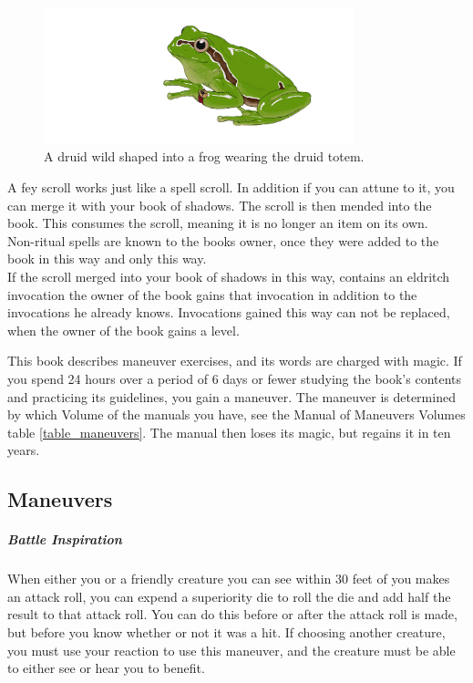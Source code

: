 \documentclass[letter,10pt,twocolumn,openany]{dndbook}
\begin{document}
\begin{figure}
    \includegraphics[width=9cm]{images/frog.png}
    \caption{A druid wild shaped into a frog wearing the druid totem.}
\end{figure}


A fey scroll works just like a spell scroll. In addition if you can attune to it, you can merge it with your book of shadows. The scroll is then mended into the book. This consumes the scroll, meaning it is no longer an item on its own.\\
Non-ritual spells are known to the books owner, once they were added to the book in this way and only this way.\\
If the scroll merged into your book of shadows in this way, contains an eldritch invocation the owner of the book gains that invocation in addition to the invocations he already knows. Invocations gained this way can not be replaced, when the owner of the book gains a level.

This book describes maneuver exercises, and its words are charged with magic.
If you spend 24 hours over a period of 6 days or fewer studying the book's contents and practicing its guidelines, you gain a maneuver.
The maneuver is determined by which Volume of the manuals you have, see the Manual of Maneuvers Volumes table \ref{table_maneuvers}.
The manual then loses its magic, but regains it in ten years.\\

\subsection{Maneuvers}

\subparagraph{Battle Inspiration}
When either you or a friendly creature you can see within 30 feet of you makes an attack roll, you can expend a superiority die to roll the die and add half the result to that attack roll. You can do this before or after the attack roll is made, but before you know whether or not it was a hit. If choosing another creature, you must use your reaction to use this maneuver, and the creature must be able to either see or hear you to benefit.
\end{document}
